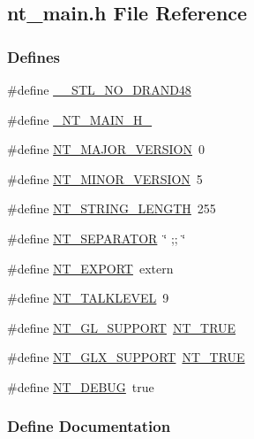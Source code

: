 \subsection{nt\_\-main.h File Reference}
\label{nt__main_8h}
\subsubsection*{Defines}
\begin{DoxyCompactItemize}
\item 
\#define \hyperlink{nt__main_8h_afa1a65dadb55963ef9a0b85d77a7aecb}{\_\-\_\-STL\_\-NO\_\-DRAND48}
\item 
\#define \hyperlink{nt__main_8h_a633bcda463a7c5a90f37c124574bc97a}{\_\-NT\_\-MAIN\_\-H\_\-}
\item 
\#define \hyperlink{nt__main_8h_ab91db9b309b1c1c01085891b9b35fccb}{NT\_\-MAJOR\_\-VERSION}~0
\item 
\#define \hyperlink{nt__main_8h_a24be44496a70b7d3c6fed3c943a35f0f}{NT\_\-MINOR\_\-VERSION}~5
\item 
\#define \hyperlink{nt__main_8h_a0832498c03d15eb104f3a98f4666eba5}{NT\_\-STRING\_\-LENGTH}~255
\item 
\#define \hyperlink{nt__main_8h_abcf6230a01176bd3c9e06d93510e3066}{NT\_\-SEPARATOR}~\char`\"{} ;; \char`\"{}
\item 
\#define \hyperlink{nt__main_8h_a0a447b643d0827e88a76e090d01486b4}{NT\_\-EXPORT}~extern
\item 
\#define \hyperlink{nt__main_8h_a0e0401ad428f852321f7cd3d35444c56}{NT\_\-TALKLEVEL}~9
\item 
\#define \hyperlink{nt__main_8h_a2d4fd0aed3fa1192371441b7b41b38ae}{NT\_\-GL\_\-SUPPORT}~\hyperlink{nt__types_8h_a2016889a74e7f2b5e1ff959bbc3f0cb1}{NT\_\-TRUE}
\item 
\#define \hyperlink{nt__main_8h_ac0b3ac35d9a3f142c5e156574bf3a97e}{NT\_\-GLX\_\-SUPPORT}~\hyperlink{nt__types_8h_a2016889a74e7f2b5e1ff959bbc3f0cb1}{NT\_\-TRUE}
\item 
\#define \hyperlink{nt__main_8h_a5eb1ed356007ebc95c88708bf5fea6f5}{NT\_\-DEBUG}~true
\end{DoxyCompactItemize}


\subsubsection{Define Documentation}
